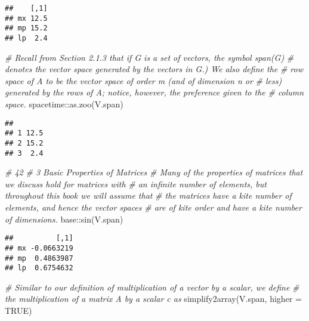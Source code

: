 \documentclass[
]{article}
\newenvironment{Shaded}{\begin{snugshade}}{\end{snugshade}}
\newcommand{\AttributeTok}[1]{\textcolor[rgb]{0.77,0.63,0.00}{#1}}
\newcommand{\CommentTok}[1]{\textcolor[rgb]{0.56,0.35,0.01}{\textit{#1}}}
\newcommand{\ConstantTok}[1]{\textcolor[rgb]{0.00,0.00,0.00}{#1}}
\newcommand{\FunctionTok}[1]{\textcolor[rgb]{0.00,0.00,0.00}{#1}}
\newcommand{\NormalTok}[1]{#1}
\newcommand{\SpecialCharTok}[1]{\textcolor[rgb]{0.00,0.00,0.00}{#1}}
\begin{document}
\begin{verbatim}
##    [,1]
## mx 12.5
## mp 15.2
## lp  2.4
\end{verbatim}

\begin{Shaded}
\begin{Highlighting}[]
\CommentTok{\# Recall from Section 2.1.3 that if G is a set of vectors, the symbol span(G)}
\CommentTok{\# denotes the vector space generated by the vectors in G.) We also define the}
\CommentTok{\# row space of A to be the vector space of order m (and of dimension n or}
\CommentTok{\# less) generated by the rows of A; notice, however, the preference given to the}
\CommentTok{\# column space.}
\NormalTok{spacetime}\SpecialCharTok{::}\FunctionTok{as.zoo}\NormalTok{(V.span)}
\end{Highlighting}
\end{Shaded}

\begin{verbatim}
##       
## 1 12.5
## 2 15.2
## 3  2.4
\end{verbatim}

\begin{Shaded}
\begin{Highlighting}[]
\CommentTok{\# 42}
\CommentTok{\# 3 Basic Properties of Matrices}
\CommentTok{\# Many of the properties of matrices that we discuss hold for matrices with}
\CommentTok{\# an infinite number of elements, but throughout this book we will assume that}
\CommentTok{\# the matrices have a kite number of elements, and hence the vector spaces}
\CommentTok{\# are of kite order and have a kite number of dimensions.}
\NormalTok{base}\SpecialCharTok{::}\FunctionTok{sin}\NormalTok{(V.span)}
\end{Highlighting}
\end{Shaded}

\begin{verbatim}
##          [,1]
## mx -0.0663219
## mp  0.4863987
## lp  0.6754632
\end{verbatim}

\begin{Shaded}
\begin{Highlighting}[]
\CommentTok{\# Similar to our definition of multiplication of a vector by a scalar, we define}
\CommentTok{\# the multiplication of a matrix A by a scalar c as}
\FunctionTok{simplify2array}\NormalTok{(V.span, }\AttributeTok{higher =} \ConstantTok{TRUE}\NormalTok{)}
\end{Highlighting}
\end{Shaded}
\end{document}
